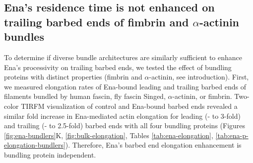 \begin{figure}
\end{figure}


\subsection{Ena's residence time is not enhanced on trailing barbed ends of fimbrin and \texorpdfstring{$\alpha$}{a}-actinin bundles}\label{ena-processive-fimbrin-aact}

To determine if diverse bundle architectures are similarly sufficient to enhance Ena's processivity on trailing barbed ends, we tested the effect of bundling proteins with distinct properties (fimbrin and $\alpha$-actinin, see introduction). First, we measured elongation rates of Ena-bound leading and trailing barbed ends of filaments bundled by human fascin, fly fascin Singed, $\alpha$-actinin, or fimbrin. Two-color TIRFM visualization of control and Ena-bound barbed ends revealed a similar fold increase in Ena-mediated actin elongation for leading (- to 3-fold) and trailing (- to 2.5-fold) barbed ends with all four bundling proteins (Figures \ref{fig:ena-bundlers}K, \ref{fig:bulk-elongation}, Tables \ref{tab:ena-elongation}, \ref{tab:ena-p-elongation-bundlers}). Therefore, Ena's barbed end elongation enhancement is bundling protein independent. 

